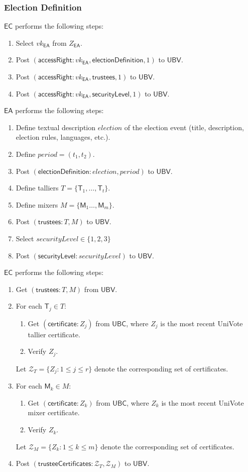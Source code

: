 \documentclass[bibtotoc,halfparskip,oneside]{scrreprt}
\newcommand{\descrElection}{\mathit{election}\xspace}
\newcommand{\period}{\mathit{period}\xspace}
\newcommand{\security}{\mathit{securityLevel}\xspace}
\newcommand{\vk}[1]{\mathit{vk}_{#1}\xspace}
\newcommand{\EA}{\ensuremath{\mathsf{EA}}\xspace}
\newcommand{\EC}{\ensuremath{\mathsf{EC}}\xspace}
\newcommand{\UBC}{\ensuremath{\mathsf{UBC}}\xspace}
\newcommand{\UBV}{\ensuremath{\mathsf{UBV}}\xspace}
\newcommand{\Tallier}[1]{\ensuremath{\mathsf{T}_{#1}}\xspace}
\newcommand{\Mixer}[1]{\ensuremath{\mathsf{M}_{#1}}\xspace}
\begin{document}
\subsubsection{Election Definition}
\EC performs the following steps: 
\begin{enumerate}
	\item Select $\vk{\EA}$ from $Z_{\EA}$.
	\item Post $(\mathsf{accessRight}: \vk{\EA}, \mathsf{electionDefinition}, 1)$ to \UBV.
	\item Post $(\mathsf{accessRight}: \vk{\EA}, \mathsf{trustees}, 1)$ to \UBV.
	\item Post $(\mathsf{accessRight}: \vk{\EA}, \mathsf{securityLevel}, 1)$ to \UBV.
\end{enumerate}
\EA performs the following steps: 
\begin{enumerate}[resume]
	\item Define textual description $\descrElection$ of the election event (title, description, election rules, languages, etc.).
	\item Define $\period =(t_{1},t_{2})$.
	\item Post $(\mathsf{electionDefinition}: \descrElection,\period)$ to \UBV.
	\item Define talliers $T=\{\Tallier{1},\ldots,\Tallier{t}\}$.
	\item Define mixers $M=\{\Mixer{1}\ldots,\Mixer{m}\}$.
	\item Post $(\mathsf{trustees}: T, M)$ to \UBV.
	\item Select $\security\in\{1,2,3\}$
	\item Post $(\mathsf{securityLevel}: \security)$ to \UBV.
\end{enumerate}
\EC performs the following steps:
\begin{enumerate}[resume]
	\item Get $(\mathsf{trustees}: T, M)$ from \UBV.
	\item For each $\Tallier{j}\in T$:
	\begin{enumerate}
		\item Get $(\textsf{certificate}:Z_{j})$ from \UBC, where $Z_j$ is the most recent UniVote tallier certificate.
		\item Verify $Z_{j}$.
	\end{enumerate}
	Let $\mathcal{Z}_{T}=\{Z_j:1\leq j\leq r\}$  denote the corresponding set of certificates.
	\item For each $\Mixer{k}\in M$:
	\begin{enumerate}
		\item Get $(\textsf{certificate}:Z_{k})$ from \UBC, where $Z_k$ is the most recent UniVote mixer certificate.
		\item Verify $Z_{k}$.
	\end{enumerate}
	Let $\mathcal{Z}_{M}=\{Z_k:1\leq k\leq m\}$ denote the corresponding set of certificates.
	\item Post $(\mathsf{trusteeCertificates}: \mathcal{Z}_{T},\mathcal{Z}_{M})$ to \UBV.
\end{enumerate}
\end{document}
